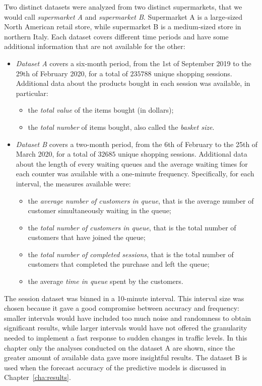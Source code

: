 Two distinct datasets were analyzed from two distinct supermarkets, that we would call \emph{supermarket A} and \emph{supermarket B}. Supermarket A is a large-sized North American retail store, while supermarket B is a medium-sized store in northern Italy. Each dataset covers different time periods and have some additional information that are not available for the other:
\begin{itemize}
  \item \emph{Dataset A} covers a six-month period, from the 1st of September 2019 to the 29th of February 2020, for a total of \( 235788 \) unique shopping sessions. Additional data about the products bought in each session was available, in particular:
        \begin{itemize}
          \item the \emph{total value} of the items bought (in dollars);
          \item the \emph{total number} of items bought, also called the \emph{basket size}.
        \end{itemize}
  \item \emph{Dataset B} covers a two-month period, from the 6th of February to the 25th of March 2020, for a total of \( 32685 \) unique shopping sessions. Additional data about the length of every waiting queues and the average waiting times for each counter was available with a one-minute frequency. Specifically, for each interval, the measures available were:
        \begin{itemize}
          \item the \emph{average number of customers in queue}, that is the average number of customer simultaneously waiting in the queue;
          \item the \emph{total number of customers in queue}, that is the total number of customers that have joined the queue;
          \item the \emph{total number of completed sessions}, that is the total number of customers that completed the purchase and left the queue;
          \item the average \emph{time in queue} spent by the customers.
        \end{itemize}
\end{itemize}

The session dataset was binned in a 10-minute interval. This interval size was chosen because it gave a good compromise between accuracy and frequency: smaller intervals would have included too much noise and randomness to obtain significant results, while larger intervals would have not offered the granularity needed to implement a fast response to sudden changes in traffic levels. In this chapter only the analyses conducted on the dataset A are shown, since the greater amount of available data gave more insightful results. The dataset B is used when the forecast accuracy of the predictive models is discussed in Chapter~\ref{cha:results}.

